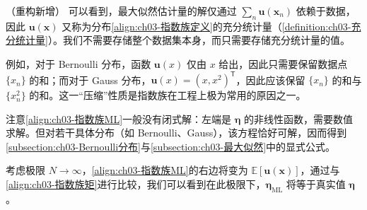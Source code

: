 \documentclass[../../main.tex]{subfiles}
\begin{document}
\begin{remark}（重构新增）
可以看到，最大似然估计量的解仅通过 $\sum_{n}\boldsymbol{u}(\boldsymbol{x}_n)$ 依赖于数据，因此 $\boldsymbol{u}(\boldsymbol{x})$ 又称为分布\eqref{align:ch03-指数族定义}的充分统计量（\cref{definition:ch03-充分统计量}）。我们不需要存储整个数据集本身，而只需要存储充分统计量的值。

例如，对于 Bernoulli 分布，函数 $\boldsymbol{u}(x)$ 仅由 $x$ 给出，因此只需要保留数据点 $\{x_n\}$ 的和；而对于 Gauss 分布，$\boldsymbol{u}(x)=(x,x^{2})^{\mathsf{T}}$，因此应该保留 $\{x_n\}$ 的和与 $\{x_n^{2}\}$ 的和。这一“压缩”性质是指数族在工程上极为常用的原因之一。

注意\eqref{align:ch03-指数族ML}一般没有闭式解：左端是 $\boldsymbol{\eta}$ 的非线性函数，需要数值求解。但对若干具体分布（如 Bernoulli、Gauss），该方程恰好可解，因而得到\cref{subsection:ch03-Bernoulli分布}与\cref{subsection:ch03-最大似然}中的显式公式。
\end{remark}

考虑极限 $N\to\infty$，\eqref{align:ch03-指数族ML}的右边将变为 $\mathbb{E}[\boldsymbol{u}(\boldsymbol{x})]$，通过与\eqref{align:ch03-指数族矩}进行比较，我们可以看到在此极限下，$\boldsymbol{\eta}_{\mathrm{ML}}$ 将等于真实值 $\boldsymbol{\eta}$。
\end{document}
